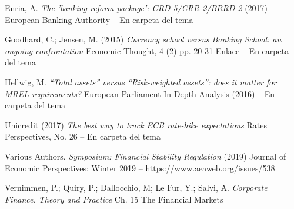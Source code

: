 \documentclass{nuevotema}
\begin{document}
Enria, A. \textit{The 'banking reform package': CRD 5/CRR 2/BRRD 2} (2017) European Banking Authority -- En carpeta del tema

Goodhard, C.; Jensen, M. (2015) \textit{Currency school versus Banking School: an ongoing confrontation} Economic Thought, 4 (2) pp. 20-31 \href{http://eprints.lse.ac.uk/64068/1/Currency\%20School\%20versus\%20Banking\%20School.pdf}{Enlace} -- En carpeta del tema

Hellwig, M. \textit{``Total assets'' versus ``Risk-weighted assets'': does it matter for MREL requirements?} European Parliament In-Depth Analysis (2016) -- En carpeta del tema

Unicredit (2017) \textit{The best way to track ECB rate-hike expectations} Rates Perspectives, No. 26 -- En carpeta del tema

Various Authors. \textit{Symposium: Financial Stability Regulation} (2019) Journal of Economic Perspectives: Winter 2019 -- \url{https://www.aeaweb.org/issues/538} 

Vernimmen, P.; Quiry, P.; Dallocchio, M; Le Fur, Y.; Salvi, A. \textit{Corporate Finance. Theory and Practice} Ch. 15 The Financial Markets
\end{document}

